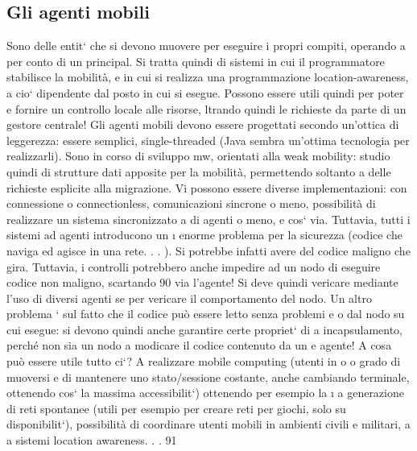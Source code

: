 \documentclass[a4paper,12pt]{article}
\begin{document}
\subsection{Gli agenti mobili}
Sono delle entit` che si devono muovere per eseguire i propri compiti, operando
a
per conto di un principal. Si tratta quindi di sistemi in cui il programmatore stabilisce la mobilità, e in cui si
realizza una programmazione location-awareness,
a
cio` dipendente dal posto in cui si esegue. Possono essere utili quindi per poter
e
fornire un controllo locale alle risorse, ltrando quindi le richieste da parte di un
gestore centrale! Gli agenti mobili devono essere progettati secondo un'ottica di
leggerezza: essere semplici, single-threaded (Java sembra un'ottima tecnologia
per realizzarli). Sono in corso di sviluppo mw, orientati alla weak mobility:
studio quindi di strutture dati apposite per la mobilità, permettendo soltanto
a
delle richieste esplicite alla migrazione.
Vi possono essere diverse implementazioni: con connessione o connectionless,
comunicazioni sincrone o meno, possibilità di realizzare un sistema sincronizzato
a
di agenti o meno, e cos` via. Tuttavia, tutti i sistemi ad agenti introducono un
\i{}
enorme problema per la sicurezza (codice che naviga ed agisce in una rete. . . ). Si
potrebbe infatti avere del codice maligno che gira. Tuttavia, i controlli potrebbero anche impedire ad un nodo di
eseguire codice non maligno, scartando
90
via l'agente! Si deve quindi vericare mediante l'uso di diversi agenti se per
vericare il comportamento del nodo.
Un altro problema ` sul fatto che il codice può essere letto senza problemi
e
o
dal nodo su cui esegue: si devono quindi anche garantire certe propriet` di
a
incapsulamento, perché non sia un nodo a modicare il codice contenuto da un
e
agente!
A cosa può essere utile tutto ci`? A realizzare mobile computing (utenti in
o
o
grado di muoversi e di mantenere uno stato/sessione costante, anche cambiando
terminale, ottenendo cos` la massima accessibilit`) ottenendo per esempio la
\i{}
a
generazione di reti spontanee (utili per esempio per creare reti per giochi, solo su
disponibilit`), possibilità di coordinare utenti mobili in ambienti civili e militari,
a
a
sistemi location awareness. . .
91
\end{document}
